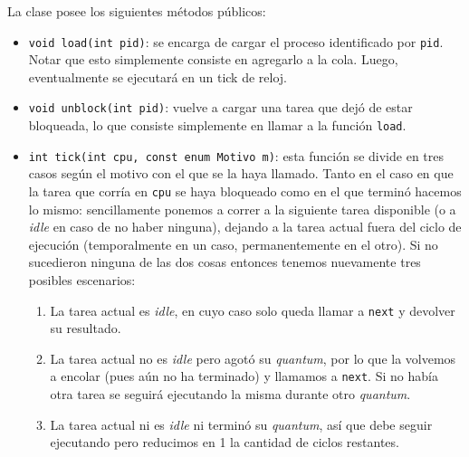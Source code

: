 La clase posee los siguientes métodos públicos:
\begin{itemize}
	\item \texttt{void load(int pid)}: se encarga de cargar el proceso identificado por \texttt{pid}. Notar que esto simplemente consiste en agregarlo a la cola. Luego, eventualmente se ejecutará en un tick de reloj.
	\item \texttt{void unblock(int pid)}: vuelve a cargar una tarea que dejó de estar bloqueada, lo que consiste simplemente en llamar a la función \texttt{load}.
	\item \texttt{int tick(int cpu, const enum Motivo m)}: esta función se divide en tres casos según el motivo con el que se la haya llamado. Tanto en el caso en que la tarea que corría en \texttt{cpu} se haya bloqueado como en el que terminó hacemos lo mismo: sencillamente ponemos a correr a la siguiente tarea disponible (o a \emph{idle} en caso de no haber ninguna), dejando a la tarea actual fuera del ciclo de ejecución (temporalmente en un caso, permanentemente en el otro). Si no sucedieron ninguna de las dos cosas entonces tenemos nuevamente tres posibles escenarios:
	\begin{enumerate}
		\item La tarea actual es \emph{idle}, en cuyo caso solo queda llamar a \texttt{next} y devolver su resultado.
		\item La tarea actual no es \emph{idle} pero agotó su \emph{quantum}, por lo que la volvemos a encolar (pues aún no ha terminado) y llamamos a \texttt{next}. Si no había otra tarea se seguirá ejecutando la misma durante otro \emph{quantum}.
		\item La tarea actual ni es \emph{idle} ni terminó su \emph{quantum}, así que debe seguir ejecutando pero reducimos en 1 la cantidad de ciclos restantes.
	\end{enumerate}
\end{itemize}
